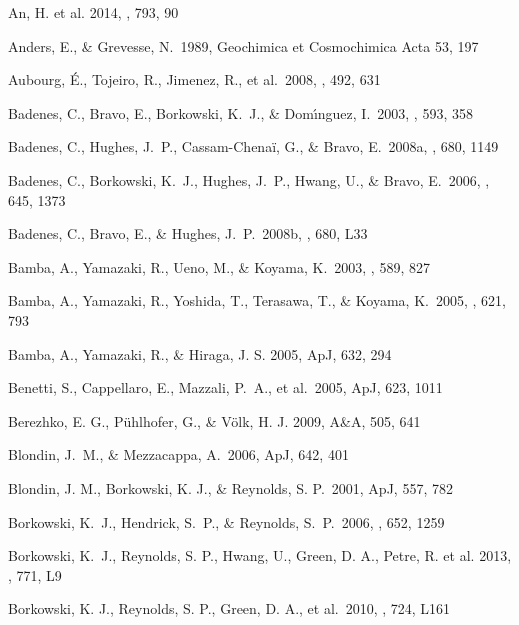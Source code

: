 \documentclass[11pt,a4paper]{article}
\begin{document}
{\begin{multicols}{2}
{\begin{thebibliography}{99}
 An, H. et al. 2014, \apj, 793, 90

 Anders, E., \& Grevesse,
  N.~1989, Geochimica et Cosmochimica Acta 53, 197

 Aubourg, {\'E}., Tojeiro,
  R., Jimenez, R., et al.\ 2008, \aap, 492, 631

 Badenes, C., Bravo, E., 
Borkowski, K.~J., \& Dom{\'{\i}}nguez, I.\ 2003, \apj, 593, 358 

 Badenes, C., Hughes, 
J.~P., Cassam-Chena{\"i}, G., \& Bravo, E.\ 2008a, \apj, 680, 1149 

 Badenes, C., Borkowski,
  K.~J., Hughes, J.~P., Hwang, U., \& Bravo, E.\ 2006, \apj, 645, 1373

 Badenes, C., Bravo, E., 
\& Hughes, J.~P.\ 2008b, \apj, 680, L33 

 Bamba, A., Yamazaki, R., Ueno,
  M., \& Koyama, K.\ 2003, \apj, 589, 827

 Bamba, A., Yamazaki, R.,
  Yoshida, T., Terasawa, T., \& Koyama, K.\ 2005, \apj, 621, 793

Bamba, A., Yamazaki, R., \& Hiraga, J. S. 2005, ApJ, 632, 294

 Benetti, S.,
Cappellaro, E., Mazzali, P.~A., et al.\ 2005, ApJ, 623, 1011

Berezhko, E. G., P\"uhlhofer, G., \& V\"olk, H. J. 2009, A\&A, 505, 641

Blondin, J.~M., \&
  Mezzacappa, A.\ 2006, ApJ, 642, 401

 Blondin, J. M., Borkowski,
  K. J., \& Reynolds, S. P.\ 2001, ApJ, 557, 782

 Borkowski, K.~J., 
Hendrick, S.~P., \& Reynolds, S.~P.\ 2006, \apj, 652, 1259 

 Borkowski, K.~J., 
Reynolds, S. P., Hwang, U., Green, D. A., Petre, R. et al.
2013, \apj, 771, L9


 Borkowski, K. J.,
  Reynolds, S. P., Green, D. A., et al.\ 2010, \apj, 724, L161


\end{thebibliography}}
\end{multicols}}
\end{document}
